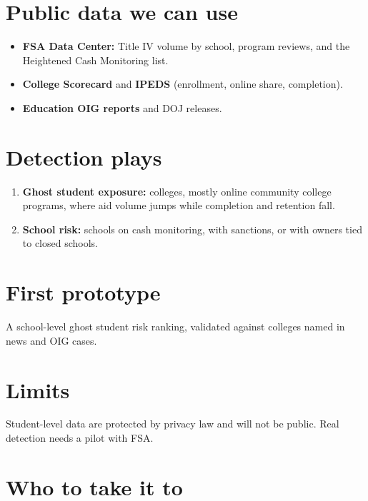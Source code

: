 \documentclass[letterpaper,11pt]{article}
\providecommand{\tightlist}{\setlength{\itemsep}{0pt}\setlength{\parskip}{0pt}}
\begin{document}
\hypertarget{public-data-we-can-use}{%
\section{Public data we can use}\label{public-data-we-can-use}}

\begin{itemize}
\tightlist
\item
  \textbf{FSA Data Center:} Title IV volume by school, program reviews,
  and the Heightened Cash Monitoring list.
\item
  \textbf{College Scorecard} and \textbf{IPEDS} (enrollment, online
  share, completion).
\item
  \textbf{Education OIG reports} and DOJ releases.
\end{itemize}

\hypertarget{detection-plays}{%
\section{Detection plays}\label{detection-plays}}

\begin{enumerate}
\def\labelenumi{\arabic{enumi}.}
\tightlist
\item
  \textbf{Ghost student exposure:} colleges, mostly online community
  college programs, where aid volume jumps while completion and
  retention fall.
\item
  \textbf{School risk:} schools on cash monitoring, with sanctions, or
  with owners tied to closed schools.
\end{enumerate}

\hypertarget{first-prototype}{%
\section{First prototype}\label{first-prototype}}

A school-level ghost student risk ranking, validated against colleges
named in news and OIG cases.

\hypertarget{limits}{%
\section{Limits}\label{limits}}

Student-level data are protected by privacy law and will not be public.
Real detection needs a pilot with FSA.

\hypertarget{who-to-take-it-to}{%
\section{Who to take it to}\label{who-to-take-it-to}}
\end{document}
